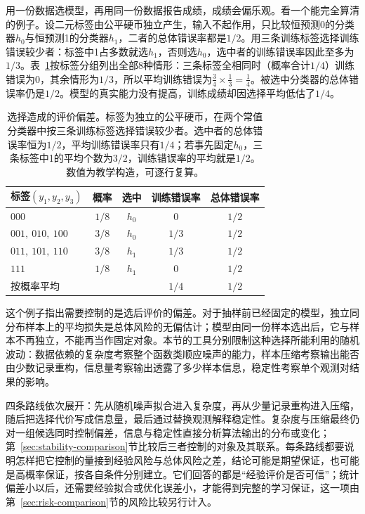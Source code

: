 用一份数据选模型，再用同一份数据报告成绩，成绩会偏乐观。看一个能完全算清的例子。设二元标签由公平硬币独立产生，输入不起作用，只比较恒预测0的分类器$h_0$与恒预测1的分类器$h_1$，二者的总体错误率都是$1/2$。用三条训练标签选择训练错误较少者：标签中1占多数就选$h_1$，否则选$h_0$，选中者的训练错误率因此至多为$1/3$。表~\ref{tab:lt7-selection-bias-coins}按标签分组列出全部8种情形：三条标签全相同时（概率合计$1/4$）训练错误为0，其余情形为$1/3$，所以平均训练错误为$\frac34\times\frac13=\frac14$。被选中分类器的总体错误率仍是$1/2$。模型的真实能力没有提高，训练成绩却因选择平均低估了$1/4$。

\begin{table}[htbp]
 \centering
 \footnotesize
 \begin{tabular}{@{}l c c c c@{}}
  \toprule
  \textbf{标签$(y_1,y_2,y_3)$} & \textbf{概率} & \textbf{选中} & \textbf{训练错误率} & \textbf{总体错误率} \\
  \midrule
  $000$ & $1/8$ & $h_0$ & $0$ & $1/2$ \\
  $001,\ 010,\ 100$ & $3/8$ & $h_0$ & $1/3$ & $1/2$ \\
  $011,\ 101,\ 110$ & $3/8$ & $h_1$ & $1/3$ & $1/2$ \\
  $111$ & $1/8$ & $h_1$ & $0$ & $1/2$ \\
  \midrule
  按概率平均 & & & $1/4$ & $1/2$ \\
  \bottomrule
 \end{tabular}
 \caption{选择造成的评价偏差。标签为独立的公平硬币，在两个常值分类器中按三条训练标签选择错误较少者。选中者的总体错误率恒为$1/2$，平均训练错误率只有$1/4$；若事先固定$h_0$，三条标签中1的平均个数为$3/2$，训练错误率的平均就是$1/2$。数值为教学构造，可逐行复算。}
 \label{tab:lt7-selection-bias-coins}
\end{table}

这个例子指出需要控制的是选后评价的偏差。对于抽样前已经固定的模型，独立同分布样本上的平均损失是总体风险的无偏估计；模型由同一份样本选出后，它与样本不再独立，不能再当作固定对象。本节的工具分别限制这种选择所能利用的随机波动：数据依赖的复杂度考察整个函数类顺应噪声的能力，样本压缩考察输出能否由少数记录重构，信息量考察输出透露了多少样本信息，稳定性考察单个观测对结果的影响。

四条路线依次展开：先从随机噪声拟合进入复杂度，再从少量记录重构进入压缩，随后把选择代价写成信息量，最后通过替换观测解释稳定性。复杂度与压缩最终仍对一组候选同时控制偏差，信息与稳定性直接分析算法输出的分布或变化；第~\ref{sec:stability-comparison}节比较后三者控制的对象及其联系。每条路线都要说明怎样把它控制的量接到经验风险与总体风险之差，结论可能是期望保证，也可能是高概率保证，按各自条件分别建立。它们回答的都是“经验评价是否可信”；统计偏差小以后，还需要经验拟合或优化误差小，才能得到完整的学习保证，这一项由第~\ref{sec:risk-comparison}节的风险比较另行计入。

